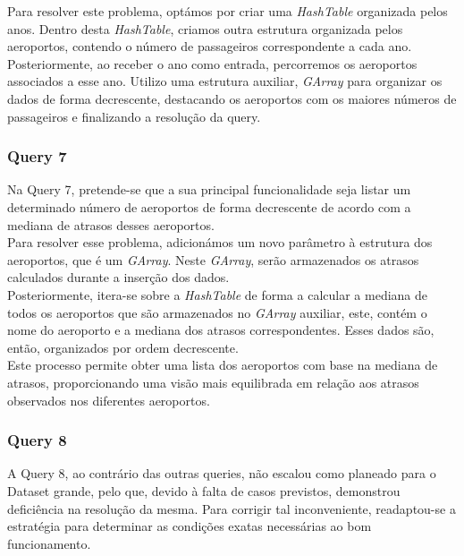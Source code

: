 \documentclass[12pt,a4paper]{article}
\begin{document}
    Para resolver este problema, optámos por criar uma \textit{HashTable} organizada pelos anos. Dentro desta \textit{HashTable}, criamos outra estrutura organizada pelos aeroportos, contendo o número de passageiros correspondente a cada ano.\\

    Posteriormente, ao receber o ano como entrada, percorremos os aeroportos associados a esse ano. Utilizo uma estrutura auxiliar, \textit{GArray} para organizar os dados de forma decrescente, destacando os aeroportos com os maiores números de passageiros e finalizando a resolução da query.
    
    \subsubsection{Query 7}
    \hspace{0,6cm} Na Query 7, pretende-se que a sua principal funcionalidade seja listar um determinado número de aeroportos de forma decrescente de acordo com a mediana de atrasos desses aeroportos.\\
    
    Para resolver esse problema, adicionámos um novo parâmetro à estrutura dos aeroportos, que é um \textit{GArray}. Neste \textit{GArray}, serão armazenados os atrasos calculados durante a inserção dos dados.\\

     Posteriormente, itera-se sobre a \textit{HashTable} de forma a calcular a mediana de todos os aeroportos que são armazenados no \textit{GArray} auxiliar, este, contém o nome do aeroporto e a mediana dos atrasos correspondentes. Esses dados são, então, organizados por ordem decrescente.\\

     Este processo permite obter uma lista dos aeroportos com base na mediana de atrasos, proporcionando uma visão mais equilibrada em relação aos atrasos observados nos diferentes aeroportos.

    \subsubsection{Query 8}
    \hspace{0,6cm}A Query 8, ao contrário das outras queries, não escalou como planeado para o Dataset grande, pelo que, devido à falta de casos previstos, demonstrou deficiência na resolução da mesma. Para corrigir tal inconveniente, readaptou-se a estratégia para determinar as condições exatas necessárias ao bom funcionamento.
\end{document}
